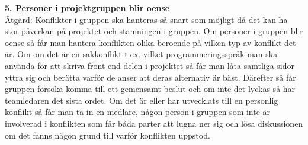\documentclass[a4paper,10pt]{article}
\begin{document}
\textbf{5. Personer i projektgruppen blir oense}\\
Åtgärd: Konflikter i gruppen ska hanteras så snart som möjligt då det kan ha stor påverkan på projektet och stämningen i gruppen. Om personer i gruppen blir oense så får man hantera konflikten olika beroende på vilken typ av konflikt det är.
Om om det är en sakkonflikt t.ex. vilket programmeringsspråk man ska använda för att skriva front-end delen i projektet så får man låta samtliga sidor yttra sig och berätta varför de anser att deras alternativ är bäst. Därefter så får gruppen försöka komma till ett gemensamt beslut och om inte det lyckas så har teamledaren det sista ordet.
Om det är eller har utvecklats till en personlig konflikt så får man ta in en medlare, någon person i gruppen som inte är involverad i konflikten som får båda parter att lugna ner sig och lösa diskussionen om det fanns någon grund till varför konflikten uppstod.
\end{document}
